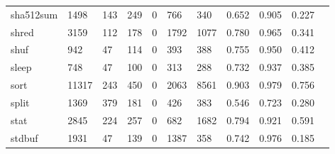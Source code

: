 \begin{longtable}{lp{1.10cm}p{1.10cm}p{1.10cm}p{1.10cm}p{1.10cm}p{1.10cm}p{1.10cm}p{1.10cm}p{1.10cm}p{1.10cm}}
sha512sum &                   1498 &                                143 &                               249 &                                0 &                               766 &                             340 &                          0.652 &                                 0.905 &                               0.227 \\
shred     &                   3159 &                                112 &                               178 &                                0 &                              1792 &                            1077 &                          0.780 &                                 0.965 &                               0.341 \\
shuf      &                    942 &                                 47 &                               114 &                                0 &                               393 &                             388 &                          0.755 &                                 0.950 &                               0.412 \\
sleep     &                    748 &                                 47 &                               100 &                                0 &                               313 &                             288 &                          0.732 &                                 0.937 &                               0.385 \\
sort      &                  11317 &                                243 &                               450 &                                0 &                              2063 &                            8561 &                          0.903 &                                 0.979 &                               0.756 \\
split     &                   1369 &                                379 &                               181 &                                0 &                               426 &                             383 &                          0.546 &                                 0.723 &                               0.280 \\
stat      &                   2845 &                                224 &                               257 &                                0 &                               682 &                            1682 &                          0.794 &                                 0.921 &                               0.591 \\
stdbuf    &                   1931 &                                 47 &                               139 &                                0 &                              1387 &                             358 &                          0.742 &                                 0.976 &                               0.185 \\

\end{longtable}
